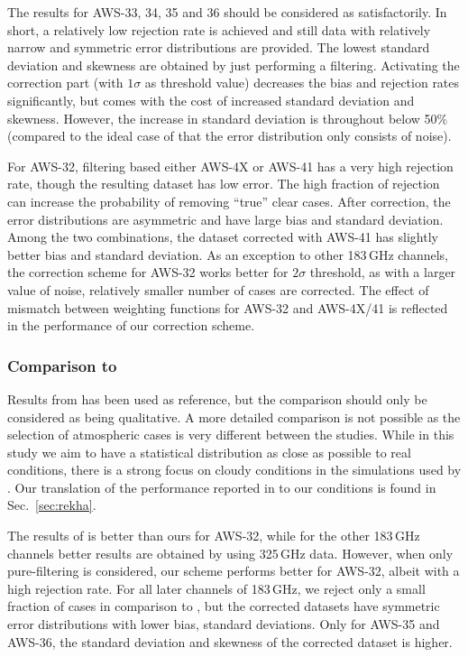 \documentclass[12pt]{article}
\begin{document}
The results for AWS-33, 34, 35 and 36 should be considered as satisfactorily.
In short, a relatively low rejection rate is achieved and still data with
relatively narrow and symmetric error distributions are provided. The lowest
standard deviation and skewness are obtained by just performing a filtering.
Activating the correction part (with $1\sigma$ as threshold value) decreases
the bias and rejection rates significantly, but comes with the cost of
increased standard deviation and skewness. However, the increase in standard
deviation is throughout below 50\% (compared to the ideal case of that the
error distribution only consists of noise). 

For AWS-32, filtering based either AWS-4X or AWS-41 has a very high rejection rate, though the resulting dataset has low error. The high fraction of rejection can increase the probability of removing ``true'' clear cases. After correction, the error distributions are asymmetric and have large bias and standard deviation. Among the two combinations, the dataset corrected with AWS-41 has slightly better bias and standard deviation. As an exception to other 183\,GHz channels, the correction scheme for AWS-32 works better for $2\sigma$ threshold, as with a larger value of noise, relatively smaller number of cases are corrected. The effect of mismatch between weighting functions for AWS-32 and AWS-4X/41 is reflected in the performance of our correction scheme.

\subsubsection{Comparison to \citet{rekha2012potential}}
%
Results from \citet{rekha2012potential} has been used as reference, but the
comparison should only be considered as being qualitative. A more detailed
comparison is not possible as the selection of atmospheric cases is very
different between the studies. While in this study we aim to have a statistical
distribution as close as possible to real conditions, there is a strong focus on
cloudy conditions in the simulations used by \citet{rekha2012potential}. Our
translation of the performance reported in \citet{rekha2012potential} to our
conditions is found in Sec.~\ref{sec:rekha}.

The results of \citet{rekha2012potential} is better than ours for AWS-32, while for the other 183\,GHz channels better results are obtained by using 325\,GHz data. However, when only pure-filtering is considered, our scheme performs better for AWS-32, albeit with a high rejection rate. For all later channels of 183\,GHz,  we reject only a small fraction of cases in comparison to \citet{rekha2012potential}, but the corrected datasets have symmetric error distributions with lower bias, standard deviations. Only for AWS-35 and AWS-36, the standard deviation and skewness of the corrected dataset is higher. 
\end{document}
